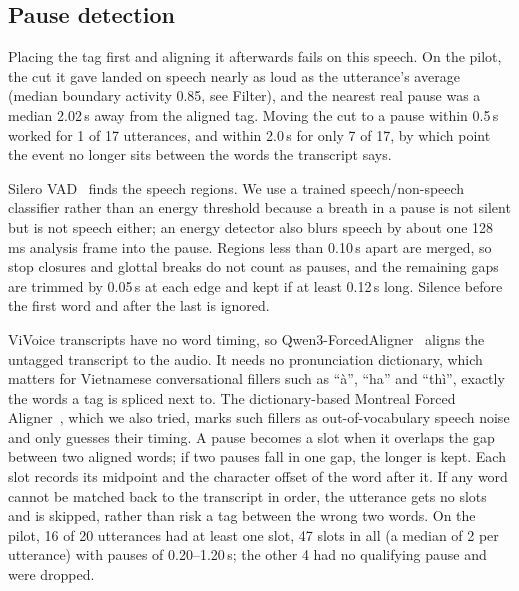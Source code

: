 \documentclass{article} %
\newcommand{\viet}[1]{{\fontencoding{T5}\selectfont #1}}
\begin{document}
\begin{table}[H]
\caption{NVV clip pool per tag. The first six classes come from VocalSound. Hours are the
summed clip durations.}
\label{tab:nvv}
\centering

\end{table}

\subsection{Pause detection}
Placing the tag first and aligning it afterwards fails on this speech. On the pilot, the cut it
gave landed on speech nearly as loud as the utterance's average (median boundary activity 0.85,
see Filter), and the nearest real pause was a median 2.02\,s away from the aligned tag. Moving
the cut to a pause within 0.5\,s worked for 1 of 17 utterances, and within 2.0\,s for only 7 of
17, by which point the event no longer sits between the words the transcript says.

Silero VAD~\citep{silerovad} finds the speech regions. We use a trained speech/non-speech
classifier rather than an energy threshold because a breath in a pause is not silent but is not
speech either; an energy detector also blurs speech by about one 128\,ms analysis frame into the
pause. Regions less than 0.10\,s apart are merged, so stop closures and glottal breaks do not
count as pauses, and the remaining gaps are trimmed by 0.05\,s at each edge and kept if at least
0.12\,s long. Silence before the first word and after the last is ignored.

ViVoice transcripts have no word timing, so Qwen3-ForcedAligner~\citep{qwen3asr} aligns the
untagged transcript to the audio. It needs no pronunciation dictionary, which matters for
Vietnamese conversational fillers such as ``\viet{à}'', ``\viet{ha}'' and ``\viet{thì}'', exactly
the words a tag is spliced next to. The dictionary-based Montreal Forced Aligner~\citep{mfa},
which we also tried, marks such fillers as out-of-vocabulary speech noise and only guesses their
timing. A pause becomes a slot when it overlaps the gap between two aligned words; if two pauses
fall in one gap, the longer is kept. Each slot records its midpoint and the character offset of
the word after it. If any word cannot be matched back to the transcript in order, the utterance
gets no slots and is skipped, rather than risk a tag between the wrong two words. On the pilot,
16 of 20 utterances had at least one slot, 47 slots in all (a median of 2 per utterance) with
pauses of 0.20--1.20\,s; the other 4 had no qualifying pause and were dropped.
\end{document}

